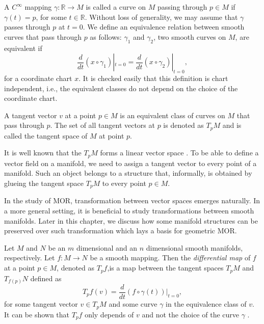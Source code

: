 A $C^{\infty}$ mapping $\gamma:\mathbb R \to M$ is called a curve on $M$ passing through $p\in M$ if $\gamma(t) = p$, for some $t\in \mathbb R$. Without loss of generality, we may assume that $\gamma$ passes through $p$ at $t=0$. We define an equivalence relation between smooth curves that pass through $p$ as follows: $\gamma_1$ and $\gamma_2$, two smooth curves on $M$, are equivalent if
\begin{equation} \label{eq:2.1}
	\frac{d}{dt}(x\circ \gamma_1)|_{t=0} = \frac{d}{dt}(x\circ \gamma_2)|_{t=0},
\end{equation}
for a coordinate chart $x$. It is checked easily that this definition is chart independent, i.e., the equivalent classes do not depend on the choice of the coordinate chart.
\begin{definition}
A tangent vector $v$ at a point $p\in M$ is an equivalent class of curves on $M$ that pass through $p$. The set of all tangent vectors at $p$ is denoted as $T_pM$ and is called the tangent space of $M$ at point $p$.
\end{definition}
It is well known that the $T_pM$ forms a linear vector space \cite{robbin2011introduction}. To be able to define a vector field on a manifold, we need to assign a tangent vector to every point of a manifold. Such an object belongs to a structure that, informally, is obtained by glueing the tangent space $T_pM$ to every point $p\in M$.

In the study of MOR, transformation between vector spaces emerges naturally. In a more general setting, it is beneficial to study transformations between smooth manifolds. Later in this chapter, we discuss how some manifold structures can be preserved over such transformation which lays a basis for geometric MOR.

Let $M$ and $N$ be an $m$ dimensional and an $n$ dimensional smooth manifolds, respectively. Let $f:M\to N$ be a smooth mapping. Then the \emph{differential map} of $f$ at a point $p\in M$, denoted as $T_{p}f$,is a map between the tangent spaces $T_p M$ and $T_{f(p)} N$ defined as
\begin{equation} \label{eq:2.2}
	T_p f(v) = \frac{d}{dt}(f\circ \gamma(t))|_{t=0},
\end{equation}
for some tangent vector $v\in T_{p} M$ and some curve $\gamma$ in the equivalence class of $v$. It can be shown that $T_p f$ only depends of $v$ and not the choice of the curve $\gamma$ \cite{robbin2011introduction}.
